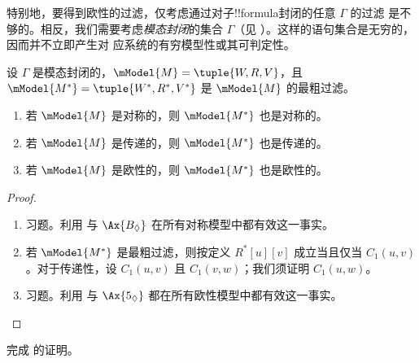\documentclass[../../../include/open-logic-section]{subfiles}
\begin{document}
特别地，要得到欧性的过滤，仅考虑通过对子!!{formula}封闭的任意 $\Gamma$ 的过滤
是不够的。相反，我们需要考虑\emph{模态封闭}的集合 $\Gamma$（见
）。这样的语句集合是无穷的，因而并不立即产生对
应系统的有穷模型性或其可判定性。

\begin{thm}
  设 $\Gamma$ 是模态封闭的，$\mModel{M}=\tuple{W,R,V}$，且
  $\mModel{M^*} = \tuple{W^*,R^*,V^*}$ 是 $\mModel{M}$ 的最粗过滤。
  \begin{enumerate}
  \item 若 $\mModel{M}$ 是对称的，则 $\mModel{M^*}$ 也是对称的。
  \item 若 $\mModel{M}$ 是传递的，则 $\mModel{M^*}$ 也是传递的。
  \item 若 $\mModel{M}$ 是欧性的，则 $\mModel{M^*}$ 也是欧性的。
  \end{enumerate}
\end{thm}

\begin{proof}
\begin{enumerate}
  \item 习题。利用  与 $\Ax{B_\Diamond}$ 在所有对称模型中都有效这一事实。
  \item 若 $\mModel{M^*}$ 是最粗过滤，则按定义 $R^*[u][v]$ 成立当且仅当
    $C_1(u,v)$。对于传递性，设 $C_1(u,v)$ 且 $C_1(v,w)$；我们须证明
    $C_1(u,w)$。
  \item 习题。利用  与 $\Ax{5_\Diamond}$ 都在所有欧性模型中都有效这一事实。
\end{enumerate}
\end{proof}

\begin{prob}
  完成  的证明。
\end{prob}
\end{document}
